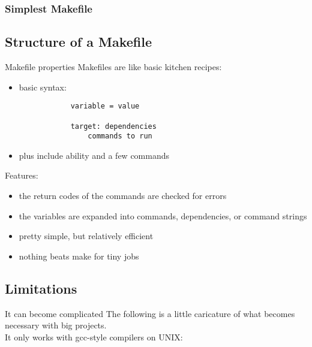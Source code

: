 \documentclass[xetex]{beamer}
\begin{document}

\begin{frame}[fragile]
	\scriptsize
	\frametitle{Simplest Makefile}
	
	
\end{frame}

\subsection{Structure of a Makefile}

\begin{frame}[fragile]{Makefile properties}
	Makefiles are like basic kitchen recipes:
	\begin{itemize}
		\item basic syntax:\\
		\begin{lstlisting}
			variable = value
		
			target: dependencies
			    commands to run
		\end{lstlisting}
		\item plus include ability and a few commands
	\end{itemize}

	Features:
	\begin{itemize}
		\item the return codes of the commands are checked for errors
		\item the variables are expanded into commands, dependencies, or command strings
		\item pretty simple, but relatively efficient
		\item nothing beats make for tiny jobs
	\end{itemize}
\end{frame}



\subsection{Limitations}

\begin{frame}{It can become complicated}
	The following is a little caricature of what becomes necessary with big projects.\\
	It only works with gcc-style compilers on UNIX:
	
	
\end{frame}
\end{document}
